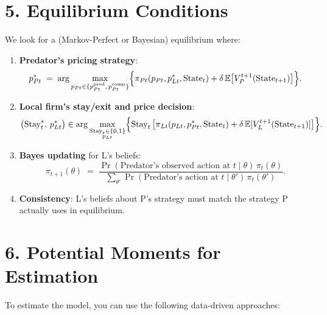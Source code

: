 \documentclass[12pt,oneside]{article}
\theoremstyle{definition}
\theoremstyle{remark}
\begin{document}
\section{5. Equilibrium Conditions}

We look for a (Markov-Perfect or Bayesian) equilibrium where:
\begin{enumerate}
  \item \textbf{Predator's pricing strategy}:
  \[
  p_{Pt}^*
  \;=\;\arg\max_{p_{Pt}\in\{p_{Pt}^{\text{pred}},\,p_{Pt}^{\text{comp}}\}}
  \Bigl\{
  \pi_{Pt}(p_{Pt},p_{Lt}^*,\text{State}_t)
  +\delta\,\mathbb{E}\bigl[V_P^{t+1}(\text{State}_{t+1})\bigr]
  \Bigr\}.
  \]
  \item \textbf{Local firm's stay/exit and price decision}:
  \[
  \bigl(\text{Stay}_t^*,\,p_{Lt}^*\bigr)
  \in
  \arg\max_{\substack{\text{Stay}_t \in\{0,1\}\\p_{Lt}}}
  \Bigl\{
    \text{Stay}_t\,\bigl[\pi_{Lt}(p_{Lt},p_{Pt}^*,\text{State}_t)
    +\delta\,\mathbb{E}[V_L^{t+1}(\text{State}_{t+1})]\bigr]
  \Bigr\}.
  \]
  \item \textbf{Bayes updating} for L's beliefs:
  \[
  \pi_{t+1}(\theta)
  \;=\;
  \frac{\Pr(\text{Predator's observed action at }t \mid \theta)\,
  \pi_t(\theta)}{
  \sum_{\theta'} \Pr(\text{Predator's action at }t \mid \theta')\,
  \pi_t(\theta')}.
  \]
  \item \textbf{Consistency}: L's beliefs about P's strategy must match the strategy P actually uses in equilibrium.
\end{enumerate}

\section{6. Potential Moments for Estimation}

To estimate the model, you can use the following data-driven approaches:
\end{document}

